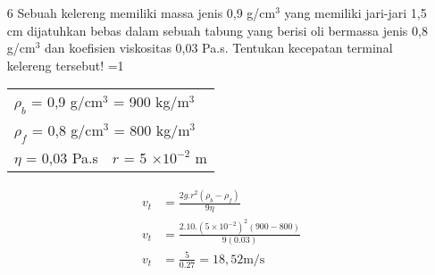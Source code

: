 \documentclass[14pt,a4paper]{extarticle}
\def\tampilkunci{0}
\newcommand{\hide}[1]{\ifnum\tampilkunci=1
%
\begin{mybox}
 #1
\end{mybox}
%
\vspace{\baselineskip}\fi}
\newcommand{\pers}[1]{\begin{align*} #1 \end{align*}}
\newcommand{\sci}[1]{$\times 10^{#1}$}
\newcommand{\scip}[1]{\times 10^{#1}}
\begin{document}
\begin{enumerate}[itemsep=0mm]
\item [6] Sebuah kelereng memiliki massa jenis 0,9 g/cm$^3$ yang memiliki jari-jari 1,5 cm dijatuhkan bebas dalam sebuah tabung yang berisi oli bermassa jenis 0,8 g/cm$^3$ dan koefisien viskositas 0,03 Pa.s. Tentukan kecepatan terminal kelereng tersebut!
\hide{
\begin{tabular}{ll}
\multicolumn{2}{l}{$\rho_b$ = 0,9 g/cm$^3$ = 900 kg/m$^3$ }\\
\multicolumn{2}{l}{$\rho_f$ = 0,8 g/cm$^3$ = 800 kg/m$^3$ }\\
$\eta$ = 0,03 Pa.s & $r$ = 5 \sci{-2} m \\
\end{tabular}
\pers{
v_t &= \frac{2 g.r^2(\rho_b-\rho_f)}{9 \eta}\\
v_t &= \frac{2.10.(5\scip{-2})^2(900-800)}{9(0.03)}\\
v_t &= \frac{5}{0.27} = 18,52 \text {m/s}
}}
 \end{enumerate}
 
\end{document}
